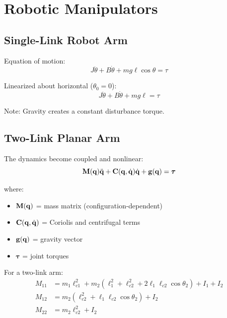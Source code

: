 \section{Robotic Manipulators}
\label{sec:robotics}

\subsection{Single-Link Robot Arm}



Equation of motion:
\begin{equation}
J\ddot{\theta} + B\dot{\theta} + mg\ell\cos\theta = \tau
\end{equation}

Linearized about horizontal ($\theta_0 = 0$):
\begin{equation}
J\ddot{\theta} + B\dot{\theta} + mg\ell = \tau
\end{equation}

Note: Gravity creates a constant disturbance torque.

\subsection{Two-Link Planar Arm}

The dynamics become coupled and nonlinear:
\begin{equation}
\mathbf{M}(\mathbf{q})\ddot{\mathbf{q}} + \mathbf{C}(\mathbf{q}, \dot{\mathbf{q}})\dot{\mathbf{q}} + \mathbf{g}(\mathbf{q}) = \boldsymbol{\tau}
\end{equation}

where:
\begin{itemize}
    \item $\mathbf{M}(\mathbf{q})$ = mass matrix (configuration-dependent)
    \item $\mathbf{C}(\mathbf{q}, \dot{\mathbf{q}})$ = Coriolis and centrifugal terms
    \item $\mathbf{g}(\mathbf{q})$ = gravity vector
    \item $\boldsymbol{\tau}$ = joint torques
\end{itemize}

For a two-link arm:
\begin{align}
M_{11} &= m_1 \ell_{c1}^2 + m_2(\ell_1^2 + \ell_{c2}^2 + 2\ell_1\ell_{c2}\cos\theta_2) + I_1 + I_2 \\
M_{12} &= m_2(\ell_{c2}^2 + \ell_1\ell_{c2}\cos\theta_2) + I_2 \\
M_{22} &= m_2\ell_{c2}^2 + I_2
\end{align}

